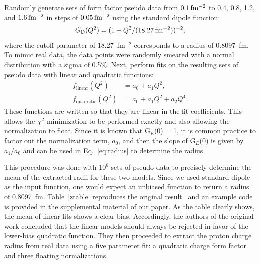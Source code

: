 \documentclass[10pt,aps,prc,twocolumn]{revtex4-1}
\begin{document}
Randomly generate sets of form factor pseudo data 
from $\unit[0.1]{fm^{-2}}$ to 0.4, 0.8, 1.2,
and $\unit[1.6]{fm^{-2}}$ 
in steps of $\unit[0.05]{fm^{-2}}$ 
using the standard dipole function:
\begin{equation}
\label{sd}
G\mathrm{_D}(Q^2) = ( 1 + Q^2/(\unit[18.27]{fm^{-2}}))^{-2},
\end{equation}
where the cutoff parameter of 18.27~fm$^{-2}$ corresponds to a radius of 0.8097~fm.
To mimic real data, the data points were randomly smeared with a normal distribution
with a sigma of 0.5\%.  
Next, perform fits on the resulting sets of pseudo data with linear and quadratic functions:
\begin{align}
f_{\mathrm{linear}}(Q^2) &  = a_0 + a_1 Q^2, \label{Eq:linear} \\
f_{\mathrm{quadratic}}(Q^2) & = a_0 + a_1 Q^2 + a_2 Q^4. \label{Eq:quadratic}
\end{align}
These functions are written so that they are linear in the fit coefficients.  
This allows the $\chi^2$ minimization to be performed exactly
and also allowing the normalization to float.   Since it is known that
G$_E$(0) = 1, it is common practice to factor out the normalization term, $a_0$, and 
then the slope of G$_E$(0) is given by $a_1/a_0$ and can be used in Eq.~\ref{eq:radius} 
to determine the radius.

This procedure was done with $10^6$ sets of pseudo data to 
precisely determine the mean of the extracted 
radii for these two models.   Since we used standard dipole as the input function, one would expect an unbiased 
function to return a radius of 0.8097~fm.
Table~\ref{ztable} reproduces the original result~\cite{Borkowski:1975} and
an example code is provided in the supplemental material of our paper.  
As the table clearly shows, the mean of linear fits shows a clear bias. 
Accordingly, the authors of the original work concluded that the linear models 
should always be rejected in favor of the lower-bias quadratic function.
They then proceeded to extract the proton charge radius from real data using a five parameter 
fit: a quadratic charge form factor and three floating normalizations.
\end{document}
